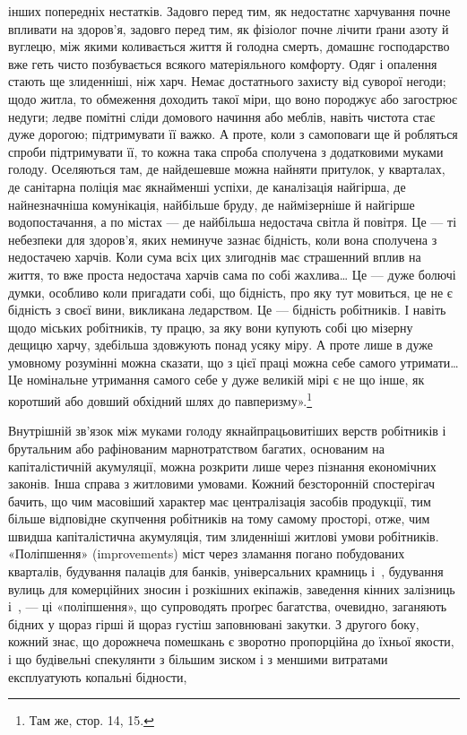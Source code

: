 \parcont{}  %
інших попередніх нестатків. Задовго перед тим, як недостатнє
харчування почне впливати на здоров’я, задовго перед тим, як
фізіолог почне лічити ґрани азоту й вуглецю, між якими коливається
життя й голодна смерть, домашнє господарство вже геть
чисто позбувається всякого матеріяльного комфорту. Одяг і
опалення стають ще злиденніші, ніж харч. Немає достатнього
захисту від суворої негоди; щодо житла, то обмеження доходить
такої міри, що воно породжує або загострює недуги; ледве помітні
сліди домового начиння або меблів, навіть чистота стає
дуже дорогою; підтримувати її важко. А проте, коли з самоповаги
ще й робляться спроби підтримувати її, то кожна така спроба
сполучена з додатковими муками голоду. Оселяються там, де
найдешевше можна найняти притулок, у кварталах, де санітарна
поліція має якнайменші успіхи, де каналізація найгірша, де
найнезначніша комунікація, найбільше бруду, де наймізерніше
й найгірше водопостачання, а по містах — де найбільша недостача
світла й повітря. Це — ті небезпеки для здоров’я, яких
неминуче зазнає бідність, коли вона сполучена з недостачею харчів.
Коли сума всіх цих злигоднів має страшенний вплив на
життя, то вже проста недостача харчів сама по собі жахлива\dots{}
Це — дуже болючі думки, особливо коли пригадати собі, що
бідність, про яку тут мовиться, це не є бідність з своєї вини,
викликана ледарством. Це — бідність робітників. І навіть щодо
міських робітників, ту працю, за яку вони купують собі цю мізерну
дещицю харчу, здебільша здовжують понад усяку міру.
А проте лише в дуже умовному розумінні можна сказати, що
з цієї праці можна себе самого утримати\dots{} Це номінальне утримання
самого себе у дуже великій мірі є не що інше, як коротший
або довший обхідний шлях до павперизму».\footnote{
Там же, стор. 14, 15.
}

Внутрішній зв’язок між муками голоду якнайпрацьовитіших
верств робітників і брутальним або рафінованим марнотратством
багатих, основаним на капіталістичній акумуляції, можна
розкрити лише через пізнання економічних законів. Інша справа
з житловими умовами. Кожний безсторонній спостерігач бачить,
що чим масовіший характер має централізація засобів продукції,
тим більше відповідне скупчення робітників на тому самому
просторі, отже, чим швидша капіталістична акумуляція, тим
злиденніші житлові умови робітників. «Поліпшення» (improvements)
міст через зламання погано побудованих кварталів,
будування палаців для банків, універсальних крамниць і~,
будування вулиць для комерційних зносин і розкішних екіпажів,
заведення кінних залізниць і~, — ці «поліпшення»,
що супроводять проґрес багатства, очевидно, заганяють бідних
у щораз гірші й щораз густіш заповнювані закутки. З другого
боку, кожний знає, що дорожнеча помешкань є зворотно пропорційна
до їхньої якости, і що будівельні спекулянти з більшим
зиском і з меншими витратами експлуатують копальні бідности,
\parbreak{}  %
